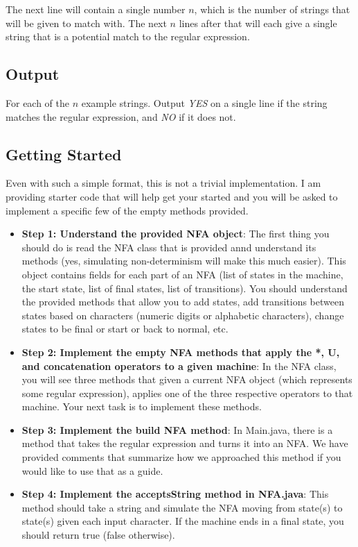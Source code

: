 \documentclass[11pt]{article}
\begin{document}
The next line will contain a single number $n$, which is the number of strings that will be given to match with. The next $n$ lines after that will each give a single string that is a potential match to the regular expression.

\subsection*{Output}

For each of the $n$ example strings. Output \emph{YES} on a single line if the string matches the regular expression, and \emph{NO} if it does not.

\subsection*{Getting Started}

Even with such a simple format, this is not a trivial implementation. I am providing starter code that will help get your started and you will be asked to implement a specific few of the empty methods provided.

\begin{itemize}
	\item \textbf{Step 1: Understand the provided NFA object}: The first thing you should do is read the NFA class that is provided annd understand its methods (yes, simulating non-determinism will make this much easier). This object contains fields for each part of an NFA (list of states in the machine, the start state, list of final states, list of transitions). You should understand the provided methods that allow you to add states, add transitions between states based on characters (numeric digits or alphabetic characters), change states to be final or start or back to normal, etc. 
	\item \textbf{Step 2: Implement the empty NFA methods that apply the *, U, and concatenation operators to a given machine}: In the NFA class, you will see three methods that given a current NFA object (which represents some regular expression), applies one of the three respective operators to that machine. Your next task is to implement these methods.
	\item \textbf{Step 3: Implement the build NFA method}: In Main.java, there is a method that takes the regular expression and turns it into an NFA. We have provided comments that summarize how we approached this method if you would like to use that as a guide.
	\item \textbf{Step 4: Implement the acceptsString method in NFA.java}: This method should take a string and simulate the NFA moving from state(s) to state(s) given each input character. If the machine ends in a final state, you should return true (false otherwise).
\end{itemize}
\end{document}
